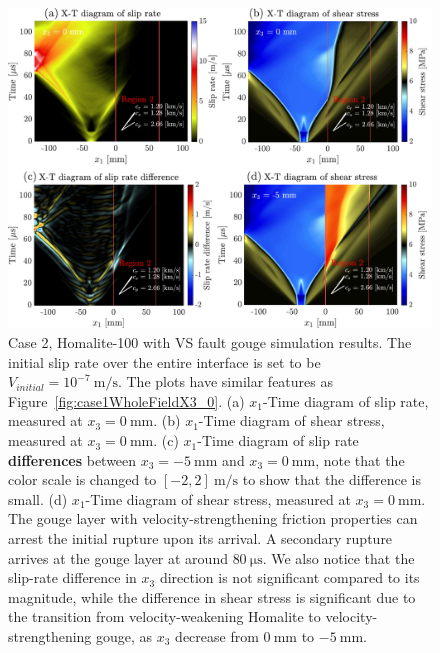 \documentclass[final,a4paper]{elsarticle}
\begin{document}
\begin{figure}[htbp]
    \centering
    \includegraphics[width=1.\textwidth]{figures/case2_wholefield_x3_0_combined.pdf}
    \caption{Case 2, Homalite-100 with VS fault gouge simulation results. 
    The initial slip rate over the entire interface is set to be $V_{initial}=10^{-7}\ \mathrm{m/s}.$ 
    The plots have similar features as Figure~\ref{fig:case1WholeFieldX3_0}. 
    (a) $x_1$-Time diagram of slip rate, measured at $x_3 =0\ \mathrm{mm}$.
    (b) $x_1$-Time diagram of shear stress, measured at $x_3 =0\ \mathrm{mm}$.
    (c) $x_1$-Time diagram of slip rate \textbf{differences} between $x_3 = -5\ \mathrm{mm}$ and $x_3 = 0\ \mathrm{mm}$, 
    note that the color scale is changed to $[-2, 2]\ \mathrm{m/s}$ to show that the difference is small.
    (d) $x_1$-Time diagram of shear stress, measured at $x_3 =0\ \mathrm{mm}$.
    The gouge layer with velocity-strengthening friction properties can arrest the initial rupture upon its arrival. 
    A secondary rupture arrives at the gouge layer at around $80\ \mathrm{\mu s}$. 
    We also notice that the slip-rate difference in $x_3$ direction is not significant compared to its magnitude, 
    while the difference in shear stress is significant due to the transition from velocity-weakening Homalite to velocity-strengthening gouge, 
    as $x_3$ decrease from $0\ \mathrm{mm}$ to $-5\ \mathrm{mm}$.}
    \label{fig:case2WholeFieldX3_combined}
\end{figure}
\end{document}
